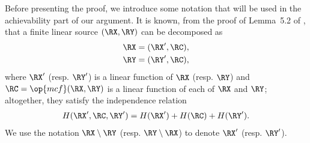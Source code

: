 
Before presenting the proof, we introduce some notation that will be used in the achievability part of our argument. It is known, from the proof of Lemma~5.2 of \cite{chan18zero}, that a finite linear source $(\RX, \RY)$ can be decomposed as
\begin{align}
        \RX &= (\RX',\RC), \label{eq:X_X'C}\\
        \RY &= (\RY',\RC), \label{eq:Y_Y'C}
\end{align}
where  $\RX'$ (resp. $\RY'$) is a linear function of $\RX$ (resp. $\RY$) and $\RC=\op{mcf}(\RX, \RY)$ is a linear function of each of $\RX$ and $\RY$; altogether, they satisfy the independence relation
\begin{align}
    H(\RX',\RC,\RY') = H(\RX')+H(\RC)+H(\RY'). \label{eq:XCY_independence}
\end{align}
We use the notation $\RX \setminus \RY$ (resp. $\RY \setminus \RX$) to denote $\RX'$ (resp. $\RY'$).

